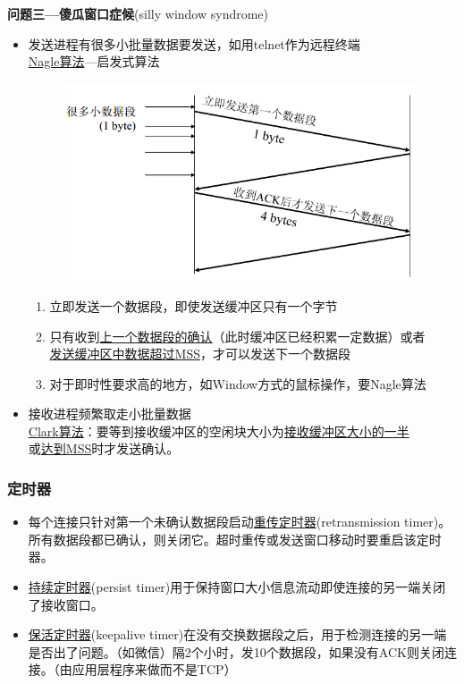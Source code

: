 \myhline
\textbf{问题三---傻瓜窗口症候}(silly window syndrome)
\begin{itemize}
    \item 发送进程有很多小批量数据要发送，如用telnet作为远程终端\\
    \underline{Nagle算法}---启发式算法
    \begin{figure}[H]
        \centering
        \includegraphics[width=0.6\linewidth]{fig/nagle.PNG}
    \end{figure}
    \begin{enumerate}
        \item 立即发送一个数据段，即使发送缓冲区只有一个字节
        \item 只有收到\underline{上一个数据段的确认}（此时缓冲区已经积累一定数据）或者\\\underline{发送缓冲区中数据超过MSS}，才可以发送下一个数据段
        \item 对于即时性要求高的地方，如Window方式的鼠标操作，要Nagle算法
    \end{enumerate}
    \item 接收进程频繁取走小批量数据\\
    \underline{Clark算法}：要等到接收缓冲区的空闲块大小为\underline{接收缓冲区大小的一半}\\或\underline{达到MSS}时才发送确认。
\end{itemize}

\subsubsection{定时器}
\begin{itemize}
\item 每个连接只针对第一个未确认数据段启动\underline{重传定时器}(retransmission timer)。所有数据段都已确认，则关闭它。超时重传或发送窗口移动时要重启该定时器。
\item \underline{持续定时器}(persist timer)用于保持窗口大小信息流动即使连接的另一端关闭了接收窗口。
\item \underline{保活定时器}(keepalive timer)在没有交换数据段之后，用于检测连接的另一端是否出了问题。（如微信）隔2个小时，发10个数据段，如果没有ACK则关闭连接。（由应用层程序来做而不是TCP）
\end{itemize}
